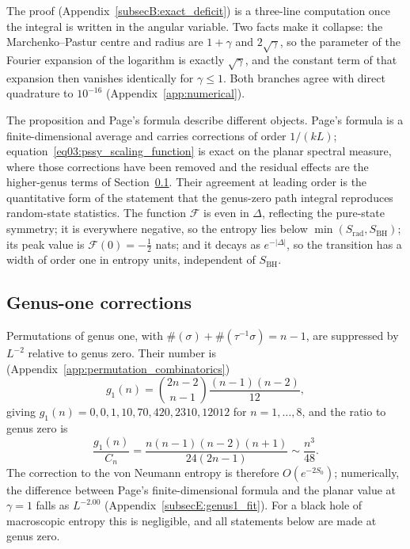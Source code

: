 \documentclass[11pt,letterpaper]{article}
\theoremstyle{plain}
\theoremstyle{definition}
\theoremstyle{remark}
\begin{document}
The proof (Appendix~\ref{subsecB:exact_deficit}) is a three-line computation once the integral is written in the angular variable. Two facts make it collapse: the Marchenko--Pastur centre and radius are $1 + \gamma$ and $2\sqrt{\gamma}$, so the parameter of the Fourier expansion of the logarithm is exactly $\sqrt{\gamma}$, and the constant term of that expansion then vanishes identically for $\gamma \le 1$. Both branches agree with direct quadrature to $10^{-16}$ (Appendix~\ref{app:numerical}).

The proposition and Page's formula describe different objects. Page's formula is a finite-dimensional average and carries corrections of order $1/(kL)$; equation~\eqref{eq03:pssy_scaling_function} is exact on the planar spectral measure, where those corrections have been removed and the residual effects are the higher-genus terms of Section~\ref{subsec03:genus_one}. Their agreement at leading order is the quantitative form of the statement that the genus-zero path integral reproduces random-state statistics. The function $\mathcal{F}$ is even in $\Delta$, reflecting the pure-state symmetry; it is everywhere negative, so the entropy lies below $\min(S_{\mathrm{rad}}, S_{\mathrm{BH}})$; its peak value is $\mathcal{F}(0) = -\tfrac12$ nats; and it decays as $e^{-|\Delta|}$, so the transition has a width of order one in entropy units, independent of $S_{\mathrm{BH}}$.

\subsection{Genus-one corrections}
\label{subsec03:genus_one}

Permutations of genus one, with $\#(\sigma) + \#(\tau^{-1}\sigma) = n - 1$, are suppressed by $L^{-2}$ relative to genus zero. Their number is~\citep{goupilschaeffer1998} (Appendix~\ref{app:permutation_combinatorics})
\begin{equation}
\label{eq03:genus_one_count}
g_1(n) = \binom{2n-2}{n-1} \frac{(n-1)(n-2)}{12},
\end{equation}
giving $g_1(n) = 0, 0, 1, 10, 70, 420, 2310, 12012$ for $n = 1, \ldots, 8$, and the ratio to genus zero is
\begin{equation}
\label{eq03:genus_ratio}
\frac{g_1(n)}{C_n} = \frac{n(n-1)(n-2)(n+1)}{24(2n-1)} \sim \frac{n^3}{48} .
\end{equation}
The correction to the von Neumann entropy is therefore $O(e^{-2S_0})$; numerically, the difference between Page's finite-dimensional formula and the planar value at $\gamma = 1$ falls as $L^{-2.00}$ (Appendix~\ref{subsecE:genus1_fit}). For a black hole of macroscopic entropy this is negligible, and all statements below are made at genus zero.
\end{document}
